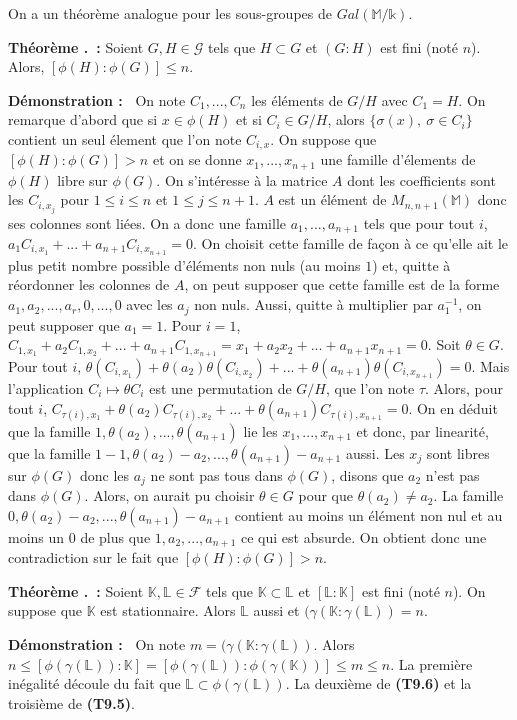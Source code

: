 \documentclass[5pt,a4paper]{article}
\newcounter{thmcounter}[subsection]
\renewcommand{\thethmcounter}{\thesubsection.\arabic{thmcounter}}
\newcommand{\thm}[1]{
    \stepcounter{thmcounter}
    \hypertarget{t:\thethmcounter}{}%
    \noindent\textbf{Théorème \thethmcounter ~:} #1 \newline
}
\newcommand{\demo}[1]{
    \textbf{Démonstration :~} #1 \newline
}
\begin{document}
\begin{onehalfspacing}
On a un théorème analogue pour les sous-groupes de $Gal(\mathbb{M}/\mathds{k})$. \newline
\thm{Soient $G, H \in \mathcal{G}$ tels que $H \subset G$ et $(G : H)$ est fini (noté $n$). Alors, $[\phi(H) : \phi(G)] \leq n$.}
\demo{On note $C_1, ..., C_n$ les éléments de $G/H$ avec $C_1 = H$. On remarque d'abord que si $x \in \phi(H)$ et si $C_i \in G/H$, alors $\{\sigma(x),~ \sigma \in C_i\}$ contient un seul élement que l'on note $C_{i, x}$. On suppose que $[\phi(H) : \phi(G)] > n$ et on se donne $x_1, ..., x_{n+1}$ une famille d'élements de $\phi(H)$ libre sur $\phi(G)$. On s'intéresse à la matrice $A$ dont les coefficients sont les $C_{i, x_j}$ pour $1 \leq i \leq n$ et $1 \leq j \leq n+1$. $A$ est un élément de $M_{n, n+1}(\mathbb{M})$ donc ses colonnes sont liées. On a donc une famille $a_1, ..., a_{n+1}$ tels que pour tout $i$, $a_1C_{i, x_1} + ... + a_{n+1}C_{i, x_{n+1}} = 0$. On choisit cette famille de façon à ce qu'elle ait le plus petit nombre possible d'éléments non nuls (au moins $1$) et, quitte à réordonner les colonnes de $A$, on peut supposer que cette famille est de la forme $a_1, a_2, ..., a_r, 0, ..., 0$ avec les $a_j$ non nuls. Aussi, quitte à multiplier par $a_1^{-1}$, on peut supposer que $a_1 = 1$. Pour $i = 1$, $C_{1, x_1} + a_2C_{1, x_2} + ... + a_{n+1}C_{1, x_{n+1}} = x_1 + a_2x_2 + ... + a_{n+1}x_{n+1} = 0$. Soit $\theta \in G$. Pour tout $i$, $\theta(C_{i, x_1}) + \theta(a_2)\theta(C_{i, x_2}) + ... + \theta(a_{n+1})\theta(C_{i, x_{n+1}}) = 0$. Mais l'application $C_i \mapsto \theta C_i$ est une permutation de $G/H$, que l'on note $\tau$. Alors, pour tout $i$, $C_{\tau(i), x_1} + \theta(a_2)C_{\tau(i), x_2} + ... + \theta(a_{n+1})C_{\tau(i), x_{n+1}} = 0$. On en déduit que la famille $1, \theta(a_2), ..., \theta(a_{n+1})$ lie les $x_1, ..., x_{n+1}$ et donc, par linearité, que la famille $1 - 1, \theta(a_2) - a_2, ..., \theta(a_{n+1}) - a_{n+1}$ aussi. Les $x_j$ sont libres sur $\phi(G)$ donc les $a_j$ ne sont pas tous dans $\phi(G)$, disons que $a_2$ n'est pas dans $\phi(G)$. Alors, on aurait pu choisir $\theta \in G$ pour que $\theta(a_2) \neq a_2$. La famille $0, \theta(a_2) - a_2, ..., \theta(a_{n+1}) - a_{n+1}$ contient au moins un élément non nul et au moins un $0$ de plus que $1, a_2, ..., a_{n+1}$ ce qui est absurde. On obtient donc une contradiction sur le fait que $[\phi(H) : \phi(G)] > n$.}


\thm{Soient $\mathbb{K}, \mathbb{L} \in \mathcal{F}$ tels que $\mathbb{K} \subset \mathbb{L}$ et $[\mathbb{L} : \mathbb{K}]$ est fini (noté $n$). On suppose que $\mathbb{K}$ est stationnaire. Alors $\mathbb{L}$ aussi et $(\gamma(\mathbb{K} : \gamma(\mathbb{L})) = n$.}
\demo{On note $m = (\gamma(\mathbb{K} : \gamma(\mathbb{L}))$. Alors $n \leq [\phi(\gamma(\mathbb{L})) : \mathbb{K}] = [\phi(\gamma(\mathbb{L})) : \phi(\gamma(\mathbb{K}))] \leq m \leq n$. La première inégalité découle du fait que $\mathbb{L} \subset \phi(\gamma(\mathbb{L}))$. La deuxième de \textbf{(T9.6)} et la troisième de \textbf{(T9.5)}.}



\end{onehalfspacing}
\end{document}
